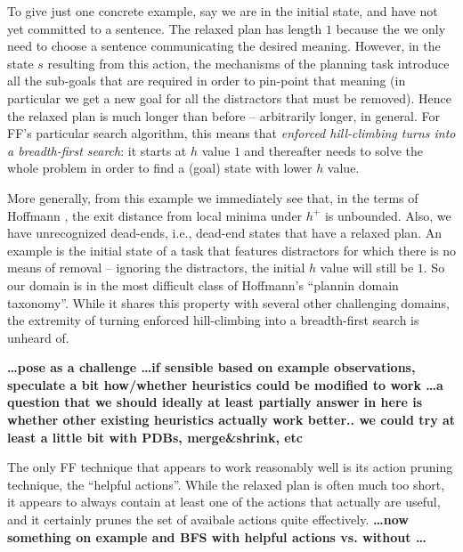 To give just one concrete example, say we are in the initial state,
and have not yet committed to a sentence. The relaxed plan has length
$1$ because the we only need to choose a sentence communicating the
desired meaning. However, in the state $s$ resulting from this action,
the mechanisms of the planning task introduce all the sub-goals that
are required in order to pin-point that meaning (in particular we get
a new goal for all the distractors that must be removed). Hence the
relaxed plan is much longer than before -- arbitrarily longer, in
general. For FF's particular search algorithm, this means that {\em
  enforced hill-climbing turns into a breadth-first search}: it starts
at $h$ value $1$ and thereafter needs to solve the whole problem in
order to find a (goal) state with lower $h$ value.




More generally, from this example we immediately see that, in the
terms of Hoffmann , the exit distance from
local minima under $h^+$ is unbounded. Also, we have unrecognized
dead-ends, i.e., dead-end states that have a relaxed plan. An example
is the initial state of a task that features distractors for which
there is no means of removal -- ignoring the distractors, the initial
$h$ value will still be $1$. So our domain is in the most difficult
class of Hoffmann's  ``plannin domain
taxonomy''. While it shares this property with several other
challenging domains, the extremity of turning enforced hill-climbing
into a breadth-first search is unheard of.



{\bf \dots pose as a challenge \dots if sensible based on example
  observations, speculate a bit how/whether heuristics could be
  modified to work \dots a question that we should ideally at least
  partially answer in here is whether other existing heuristics
  actually work better.. we could try at least a little bit with PDBs,
  merge\&shrink, etc}



The only FF technique that appears to work reasonably well is its
action pruning technique, the ``helpful actions''. While the relaxed
plan is often much too short, it appears to always contain at least
one of the actions that actually are useful, and it certainly prunes
the set of avaibale actions quite effectively. {\bf \dots now
  something on example and BFS with helpful actions vs. without \dots}




